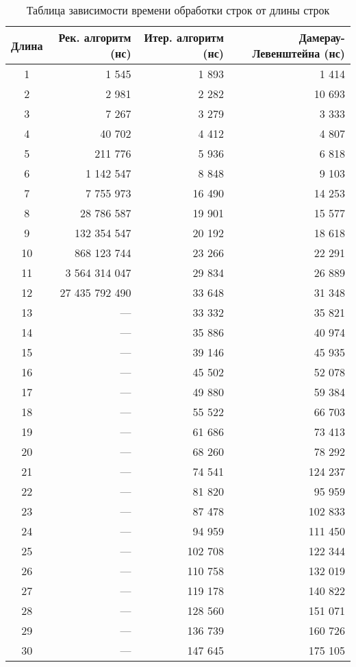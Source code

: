 \begin{longtable}[]{|c|r|r|r|}
\caption{Таблица зависимости времени обработки строк от длины строк}
\label{tbl:time_table}
\\
\hline
Длина & Рек. алгоритм (нс) & Итер. алгоритм (нс) &  Дамерау-Левенштейна (нс) \\ \hline
1 & 1 545 & 1 893 & 1 414 \\ \hline
2& 2 981& 2 282&  10 693 \\ \hline
3& 7 267& 3 279&3 333 \\ \hline
4&40 702& 4 412&4 807 \\ \hline
5& 211 776& 5 936&6 818 \\ \hline
6&1 142 547& 8 848&9 103 \\ \hline
7&7 755 973&16 490&  14 253 \\ \hline
8&  28 786 587&19 901&  15 577 \\ \hline
9& 132 354 547&20 192&  18 618 \\ \hline
10&868 123 744&23 266&  22 291 \\ \hline
11&  3 564 314 047&29 834&  26 889 \\ \hline
12& 27 435 792 490&33 648&  31 348 \\ \hline
13 & --- &33 332&  35 821 \\ \hline
14 & --- &35 886&  40 974 \\ \hline
15 & --- &39 146&  45 935 \\ \hline
16 & --- &45 502&  52 078 \\ \hline
17 & --- &49 880&  59 384 \\ \hline
18 & --- &55 522&  66 703 \\ \hline
19 & --- &61 686&  73 413 \\ \hline
20 & --- &68 260&  78 292 \\ \hline
21 & --- &74 541& 124 237 \\ \hline
22 & --- &81 820&  95 959 \\ \hline
23 & --- &87 478& 102 833 \\ \hline
24 & --- &94 959& 111 450 \\ \hline
25 & --- & 102 708& 122 344 \\ \hline
26 & --- & 110 758& 132 019 \\ \hline
27 & --- & 119 178& 140 822 \\ \hline
28 & --- & 128 560& 151 071 \\ \hline
29 & --- & 136 739& 160 726 \\ \hline
30 & --- & 147 645& 175 105 \\ \hline

\end{longtable}
